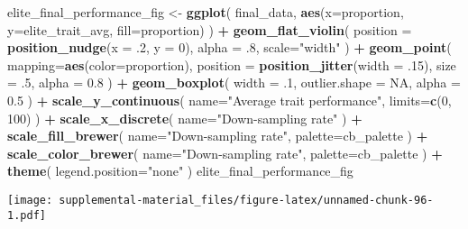 \documentclass[]{book}
\newenvironment{Shaded}{\begin{snugshade}}{\end{snugshade}}
\newcommand{\DataTypeTok}[1]{\textcolor[rgb]{0.13,0.29,0.53}{#1}}
\newcommand{\DecValTok}[1]{\textcolor[rgb]{0.00,0.00,0.81}{#1}}
\newcommand{\FloatTok}[1]{\textcolor[rgb]{0.00,0.00,0.81}{#1}}
\newcommand{\KeywordTok}[1]{\textcolor[rgb]{0.13,0.29,0.53}{\textbf{#1}}}
\newcommand{\NormalTok}[1]{#1}
\newcommand{\OperatorTok}[1]{\textcolor[rgb]{0.81,0.36,0.00}{\textbf{#1}}}
\newcommand{\OtherTok}[1]{\textcolor[rgb]{0.56,0.35,0.01}{#1}}
\newcommand{\StringTok}[1]{\textcolor[rgb]{0.31,0.60,0.02}{#1}}
\begin{document}
\begin{Shaded}
\begin{Highlighting}[]
\NormalTok{elite_final_performance_fig <-}\StringTok{ }\KeywordTok{ggplot}\NormalTok{(}
\NormalTok{    final_data,}
    \KeywordTok{aes}\NormalTok{(}\DataTypeTok{x=}\NormalTok{proportion, }\DataTypeTok{y=}\NormalTok{elite_trait_avg, }\DataTypeTok{fill=}\NormalTok{proportion)}
\NormalTok{  ) }\OperatorTok{+}
\StringTok{  }\KeywordTok{geom_flat_violin}\NormalTok{(}
    \DataTypeTok{position =} \KeywordTok{position_nudge}\NormalTok{(}\DataTypeTok{x =} \FloatTok{.2}\NormalTok{, }\DataTypeTok{y =} \DecValTok{0}\NormalTok{),}
    \DataTypeTok{alpha =} \FloatTok{.8}\NormalTok{,}
    \DataTypeTok{scale=}\StringTok{"width"}
\NormalTok{  ) }\OperatorTok{+}
\StringTok{  }\KeywordTok{geom_point}\NormalTok{(}
    \DataTypeTok{mapping=}\KeywordTok{aes}\NormalTok{(}\DataTypeTok{color=}\NormalTok{proportion),}
    \DataTypeTok{position =} \KeywordTok{position_jitter}\NormalTok{(}\DataTypeTok{width =} \FloatTok{.15}\NormalTok{),}
    \DataTypeTok{size =} \FloatTok{.5}\NormalTok{,}
    \DataTypeTok{alpha =} \FloatTok{0.8}
\NormalTok{  ) }\OperatorTok{+}
\StringTok{  }\KeywordTok{geom_boxplot}\NormalTok{(}
    \DataTypeTok{width =} \FloatTok{.1}\NormalTok{,}
    \DataTypeTok{outlier.shape =} \OtherTok{NA}\NormalTok{,}
    \DataTypeTok{alpha =} \FloatTok{0.5}
\NormalTok{  ) }\OperatorTok{+}
\StringTok{  }\KeywordTok{scale_y_continuous}\NormalTok{(}
    \DataTypeTok{name=}\StringTok{"Average trait performance"}\NormalTok{,}
    \DataTypeTok{limits=}\KeywordTok{c}\NormalTok{(}\DecValTok{0}\NormalTok{, }\DecValTok{100}\NormalTok{)}
\NormalTok{  ) }\OperatorTok{+}
\StringTok{  }\KeywordTok{scale_x_discrete}\NormalTok{(}
    \DataTypeTok{name=}\StringTok{"Down-sampling rate"}
\NormalTok{  ) }\OperatorTok{+}
\StringTok{  }\KeywordTok{scale_fill_brewer}\NormalTok{(}
    \DataTypeTok{name=}\StringTok{"Down-sampling rate"}\NormalTok{,}
    \DataTypeTok{palette=}\NormalTok{cb_palette}
\NormalTok{  ) }\OperatorTok{+}
\StringTok{  }\KeywordTok{scale_color_brewer}\NormalTok{(}
    \DataTypeTok{name=}\StringTok{"Down-sampling rate"}\NormalTok{,}
    \DataTypeTok{palette=}\NormalTok{cb_palette}
\NormalTok{  ) }\OperatorTok{+}
\StringTok{  }\KeywordTok{theme}\NormalTok{(}
    \DataTypeTok{legend.position=}\StringTok{"none"}
\NormalTok{  )}
\NormalTok{elite_final_performance_fig}
\end{Highlighting}
\end{Shaded}

\texttt{[image: supplemental-material\_files/figure-latex/unnamed-chunk-96-1.pdf]}
\end{document}
